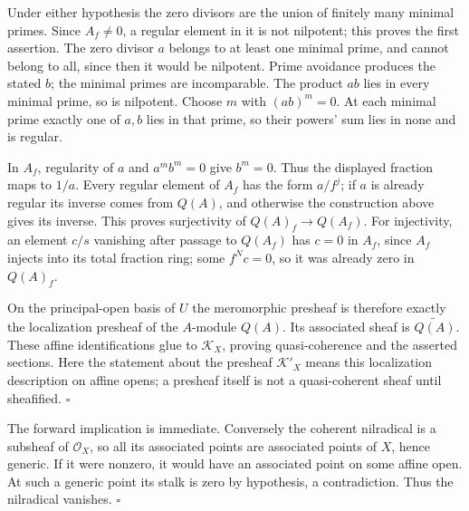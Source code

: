 \documentclass[11pt]{article}
\let\chapterexercise\exercise
\renewcommand{\exercise}[2]{\Needspace{8\baselineskip}\chapterexercise{#1}{#2}}
\begin{document}
\pf
Under either hypothesis the zero divisors are the union of finitely many minimal primes. Since $A_f\ne0$, a regular element in it is not nilpotent; this proves the first assertion. The zero divisor $a$ belongs to at least one minimal prime, and cannot belong to all, since then it would be nilpotent. Prime avoidance produces the stated $b$; the minimal primes are incomparable. The product $ab$ lies in every minimal prime, so is nilpotent. Choose $m$ with $(ab)^m=0$. At each minimal prime exactly one of $a,b$ lies in that prime, so their powers' sum lies in none and is regular.

In $A_f$, regularity of $a$ and $a^mb^m=0$ give $b^m=0$. Thus the displayed fraction maps to $1/a$. Every regular element of $A_f$ has the form $a/f^j$; if $a$ is already regular its inverse comes from $Q(A)$, and otherwise the construction above gives its inverse. This proves surjectivity of $Q(A)_f\to Q(A_f)$. For injectivity, an element $c/s$ vanishing after passage to $Q(A_f)$ has $c=0$ in $A_f$, since $A_f$ injects into its total fraction ring; some $f^Nc=0$, so it was already zero in $Q(A)_f$.

On the principal-open basis of $U$ the meromorphic presheaf is therefore exactly the localization presheaf of the $A$-module $Q(A)$. Its associated sheaf is $\widetilde{Q(A)}$. These affine identifications glue to $\mathcal K_X$, proving quasi-coherence and the asserted sections. Here the statement about the presheaf $\mathcal K'_X$ means this localization description on affine opens; a presheaf itself is not a quasi-coherent sheaf until sheafified. \hfill$\square$

\pf
The forward implication is immediate. Conversely the coherent nilradical is a subsheaf of $\mathcal O_X$, so all its associated points are associated points of $X$, hence generic. If it were nonzero, it would have an associated point on some affine open. At such a generic point its stalk is zero by hypothesis, a contradiction. Thus the nilradical vanishes. \hfill$\square$
\end{document}
